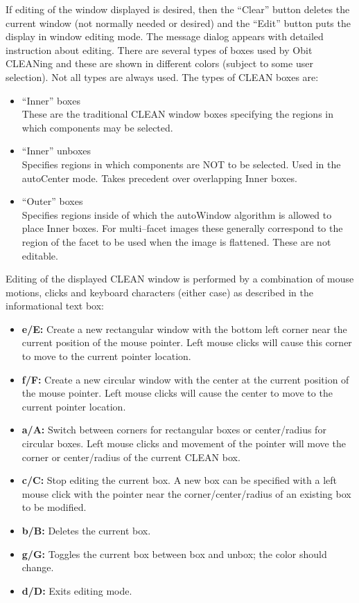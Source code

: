 \documentclass[11pt]{report}
\begin{document}
If editing of the window displayed is desired, then the ``Clear''
button deletes the current window (not normally needed or desired) and
the ``Edit'' button puts the display in window editing mode.
The message dialog appears with detailed instruction about editing.
There are several types of boxes used by Obit CLEANing and these are
shown in different colors (subject to some user selection).
Not all types are always used.
The types of CLEAN boxes are:
\begin{itemize}
\item ``Inner'' boxes \\
These are the traditional CLEAN window boxes specifying the regions in
which components may be selected.
\item ``Inner'' unboxes \\
Specifies regions in which components are NOT to be selected.
Used in the autoCenter mode.
Takes precedent over overlapping Inner boxes.
\item ``Outer'' boxes \\
Specifies regions inside of which the autoWindow algorithm is allowed
to place Inner boxes.
For multi--facet images these generally correspond to the region of
the facet to be used when the image is flattened.
These are not editable.
\end{itemize}


Editing of the displayed CLEAN window is performed by a combination of
mouse motions, clicks and keyboard characters (either case) as
described in the informational text box:
\begin{itemize}
\item {\bf e/E:} Create a new rectangular window with the bottom left
  corner near the current position of the mouse pointer.
Left mouse clicks will cause this corner to move to the current
pointer location.
\item {\bf f/F:} Create a new circular window with the center at the
  current position of the mouse pointer. 
Left mouse clicks will cause the center to move to the current
pointer location.
\item {\bf a/A:} Switch between corners for rectangular boxes or
  center/radius for circular boxes.
Left mouse clicks and movement of the pointer will move the corner
or center/radius of the current CLEAN box.
\item {\bf c/C:} Stop editing the current box.
A new box can be specified with a left mouse click with the pointer
near the corner/center/radius of an existing box to be modified.
\item {\bf b/B:} Deletes the current box.
\item {\bf g/G:} Toggles the current box between box and unbox; the
  color should change.
\item {\bf d/D:} Exits editing mode.
\end{itemize}
\end{document}
